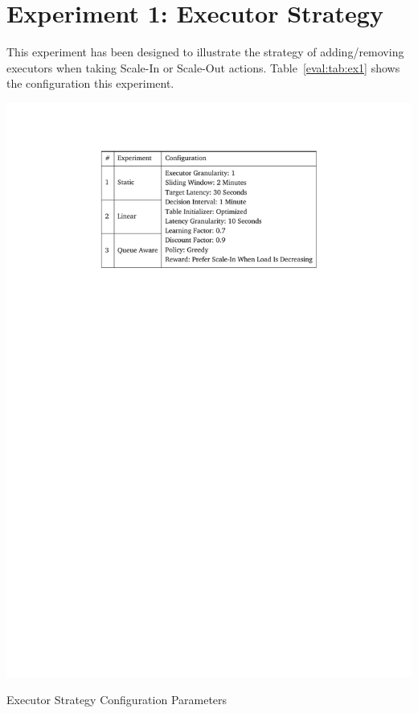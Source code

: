 \section{Experiment 1: Executor Strategy}
This experiment has been designed to illustrate the strategy of adding/removing executors when taking Scale-In or Scale-Out actions. Table~\ref{eval:tab:ex1} shows the configuration this experiment.
\begin{table}[h]
    \includegraphics[clip,trim=4.7cm 21.18cm 4.7cm 2.5cm]{tables/ex1.pdf}
    \centering
    \caption{Executor Strategy Configuration Parameters}
    \label{eval:tab:ex1}
\end{table}

